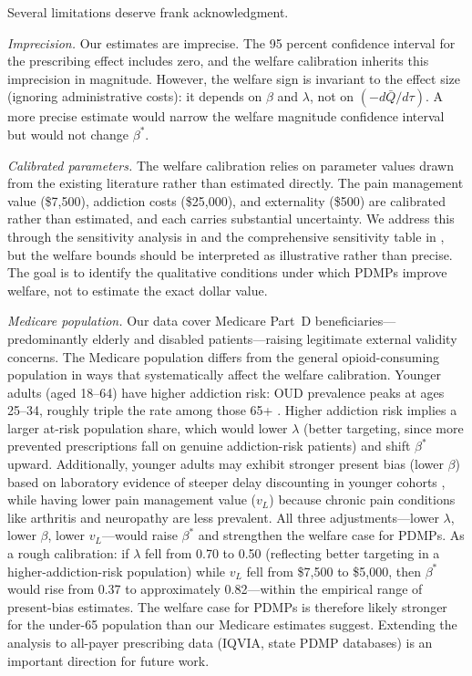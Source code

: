\documentclass[12pt]{article}
\begin{document}
Several limitations deserve frank acknowledgment.

\textit{Imprecision.} Our estimates are imprecise. The 95 percent confidence interval for the prescribing effect includes zero, and the welfare calibration inherits this imprecision in magnitude. However, the welfare sign is invariant to the effect size (ignoring administrative costs): it depends on $\beta$ and $\lambda$, not on $(-d\bar{Q}/d\tau)$. A more precise estimate would narrow the welfare magnitude confidence interval but would not change $\beta^*$.

\textit{Calibrated parameters.} The welfare calibration relies on parameter values drawn from the existing literature rather than estimated directly. The pain management value (\$7,500), addiction costs (\$25,000), and externality (\$500) are calibrated rather than estimated, and each carries substantial uncertainty. We address this through the sensitivity analysis in  and the comprehensive sensitivity table in , but the welfare bounds should be interpreted as illustrative rather than precise. The goal is to identify the qualitative conditions under which PDMPs improve welfare, not to estimate the exact dollar value.

\textit{Medicare population.} Our data cover Medicare Part~D beneficiaries---predominantly elderly and disabled patients---raising legitimate external validity concerns. The Medicare population differs from the general opioid-consuming population in ways that systematically affect the welfare calibration. Younger adults (aged 18--64) have higher addiction risk: OUD prevalence peaks at ages 25--34, roughly triple the rate among those 65+ \citep{volkow2016opioid}. Higher addiction risk implies a larger at-risk population share, which would lower $\lambda$ (better targeting, since more prevented prescriptions fall on genuine addiction-risk patients) and shift $\beta^*$ upward. Additionally, younger adults may exhibit stronger present bias (lower $\beta$) based on laboratory evidence of steeper delay discounting in younger cohorts \citep{gruber2001risky}, while having lower pain management value ($v_L$) because chronic pain conditions like arthritis and neuropathy are less prevalent. All three adjustments---lower $\lambda$, lower $\beta$, lower $v_L$---would raise $\beta^*$ and strengthen the welfare case for PDMPs. As a rough calibration: if $\lambda$ fell from 0.70 to 0.50 (reflecting better targeting in a higher-addiction-risk population) while $v_L$ fell from \$7,500 to \$5,000, then $\beta^*$ would rise from 0.37 to approximately 0.82---within the empirical range of present-bias estimates. The welfare case for PDMPs is therefore likely stronger for the under-65 population than our Medicare estimates suggest. Extending the analysis to all-payer prescribing data (IQVIA, state PDMP databases) is an important direction for future work.
\end{document}
